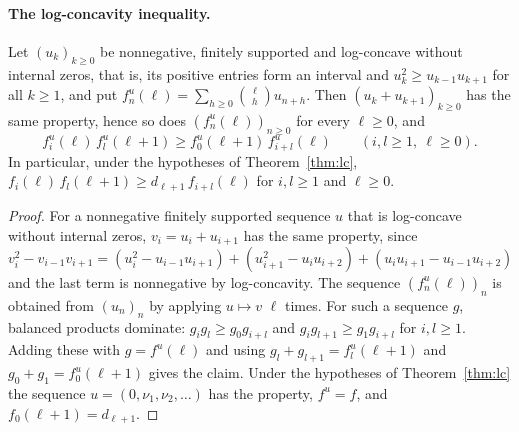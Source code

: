 \paragraph{The log-concavity inequality.}
\begin{lemma}\label{lem:lc-ineq}
Let $(u_k)_{k\geq0}$ be nonnegative, finitely supported and log-concave without internal zeros, that is, its positive entries form an interval and $u_k^2\geq u_{k-1}u_{k+1}$ for all $k\geq1$, and put $f^u_n(\ell)=\sum_{h\geq0}\binom\ell hu_{n+h}$. Then $(u_k+u_{k+1})_{k\geq0}$ has the same property, hence so does $(f^u_n(\ell))_{n\geq0}$ for every $\ell\geq0$, and
\[
f^u_i(\ell)\,f^u_l(\ell+1)\geq f^u_0(\ell+1)\,f^u_{i+l}(\ell)\qquad(i,l\geq1,\ \ell\geq0).
\]
In particular, under the hypotheses of Theorem~\ref{thm:lc}, $f_i(\ell)\,f_l(\ell+1)\geq d_{\ell+1}\,f_{i+l}(\ell)$ for $i,l\geq1$ and $\ell\geq0$.
\end{lemma}
\begin{proof}
For a nonnegative finitely supported sequence $u$ that is log-concave without internal zeros, $v_i=u_i+u_{i+1}$ has the same property, since
$v_i^2-v_{i-1}v_{i+1}=(u_i^2-u_{i-1}u_{i+1})+(u_{i+1}^2-u_iu_{i+2})+(u_iu_{i+1}-u_{i-1}u_{i+2})$
and the last term is nonnegative by log-concavity. The sequence $(f^u_n(\ell))_n$ is obtained from $(u_n)_n$ by applying $u\mapsto v$ $\ell$ times. For such a sequence $g$, balanced products dominate: $g_ig_l\geq g_0g_{i+l}$ and $g_ig_{l+1}\geq g_1g_{i+l}$ for $i,l\geq1$. Adding these with $g=f^u(\ell)$ and using $g_l+g_{l+1}=f^u_l(\ell+1)$ and $g_0+g_1=f^u_0(\ell+1)$ gives the claim. Under the hypotheses of Theorem~\ref{thm:lc} the sequence $u=(0,\nu_1,\nu_2,\ldots)$ has the property, $f^u=f$, and $f_0(\ell+1)=d_{\ell+1}$.
\end{proof}

